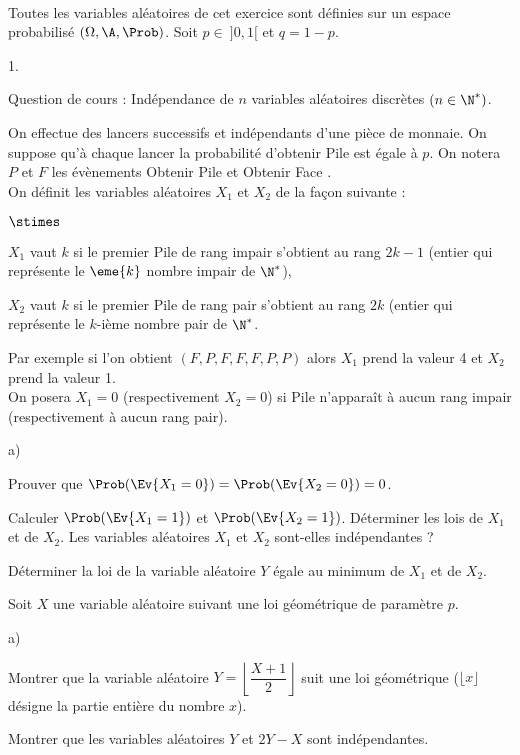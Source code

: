 \documentclass[11pt]{article}%
\begin{document}
\begin{exerciceAP}~\\
  Toutes les variables aléatoires de cet exercice sont définies sur un
  espace probabilisé $(\Omega , \A , \Prob)$. Soit $p \in \ ]0, 1[$ et
  $q = 1-p$.
  \begin{noliste}{1.}
    \setlength{\itemsep}{2mm}
  \item Question de cours : Indépendance de $n$ variables aléatoires
    discrètes $(n \in \N^*)$.
  \item On effectue des lancers successifs et indépendants d'une pièce
    de monnaie. On suppose qu'à chaque lancer la probabilité d'obtenir
    Pile est égale à $p$. On notera $P$ et $F$ les évènements \og
    Obtenir Pile \fg{} et \og Obtenir Face \fg{}.\\
    On définit les variables aléatoires $X_1$ et $X_2$ de la façon
    suivante :
    \begin{noliste}{$\stimes$}
    \item $X_1$ vaut $k$ si le premier Pile de rang impair s'obtient
      au rang $2k-1$ (entier qui représente le $\eme{k}$ nombre impair
      de $\N^*$),
    \item $X_2$ vaut $k$ si le premier Pile de rang pair s'obtient au
      rang $2k$ (entier qui représente le $k$-ième nombre pair de
      $\N^*$.
    \end{noliste}
    Par exemple si l'on obtient $(F , P , F , F , F , P , P)$ alors
    $X_1$ prend la valeur 4 et $X_2$ prend la valeur 1.\\
    On posera $X_1 = 0$ (respectivement $X_2=0$) si Pile n'apparaît à
    aucun rang impair (respectivement à aucun rang pair).
    \begin{noliste}{a)}
      \setlength{\itemsep}{2mm}
    \item Prouver que $\Prob(\Ev{X_1 = 0}) = \Prob(\Ev{X_2 = 0}) = 0$.
    \item Calculer $\Prob(\Ev{X_1 = 1})$ et $\Prob(\Ev{X_2 =
        1})$. Déterminer les lois de $X_1$ et de $X_2$. Les variables
      aléatoires $X_1$ et $X_2$ sont-elles indépendantes ?
    \item Déterminer la loi de la variable aléatoire $Y$ égale au
      minimum de $X_1$ et de $X_2$.
    \end{noliste}
  \item Soit $X$ une variable aléatoire suivant une loi géométrique de
    paramètre $p$.
    \begin{noliste}{a)}
      \setlength{\itemsep}{2mm}
    \item Montrer que la variable aléatoire $Y = \left\lfloor
        \dfrac{X+1}{2} \right\rfloor$ suit une loi géométrique
      ($\lfloor x \rfloor$ désigne la partie entière du nombre $x$).
    \item Montrer que les variables aléatoires $Y$ et $2Y - X$ sont
      indépendantes.
    \end{noliste}
  \end{noliste}
\end{exerciceAP}
  
\end{document}
